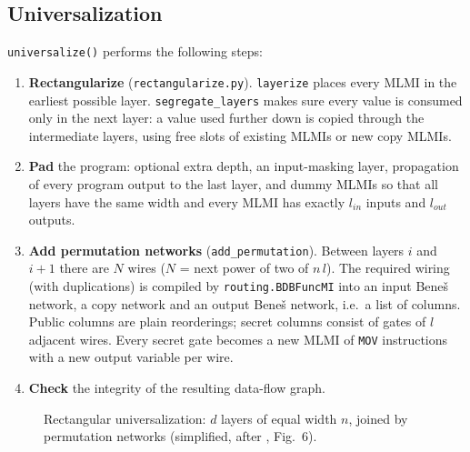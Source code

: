 \documentclass[12pt,a4paper,oneside]{report}
\newcommand{\code}[1]{\texttt{#1}}
\begin{document}
\subsection{Universalization}
\label{sec:univ}
\code{universalize()} performs the following steps:
\begin{enumerate}
\item \textbf{Rectangularize} (\code{rectangularize.py}). \code{layerize} places every MLMI in the
      earliest possible layer. \code{segregate\_layers} makes sure every value is consumed only in
      the next layer: a value used further down is copied through the intermediate layers, using
      free slots of existing MLMIs or new copy MLMIs.
\item \textbf{Pad} the program: optional extra depth, an input-masking layer, propagation of every
      program output to the last layer, and dummy MLMIs so that all layers have the same width
      and every MLMI has exactly $l_{in}$ inputs and $l_{out}$ outputs.
\item \textbf{Add permutation networks} (\code{add\_permutation}). Between layers $i$ and $i+1$ there
      are $N$ wires ($N$ = next power of two of $n\,l$). The required wiring (with duplications) is
      compiled by \code{routing.BDBFuncMI} into an input Bene\v{s} network, a copy network and an
      output Bene\v{s} network, i.e.\ a list of columns. Public columns are plain reorderings;
      secret columns consist of gates of $l$ adjacent wires. Every secret gate becomes a new MLMI
      of \code{MOV} instructions with a new output variable per wire.
\item \textbf{Check} the integrity of the resulting data-flow graph.
\end{enumerate}

\begin{figure}[H]
\centering
{}
\caption{Rectangular universalization: $d$ layers of equal width $n$, joined by permutation
networks (simplified, after \cite{obscure}, Fig.~6).}
\label{fig:rect}
\end{figure}
\end{document}

